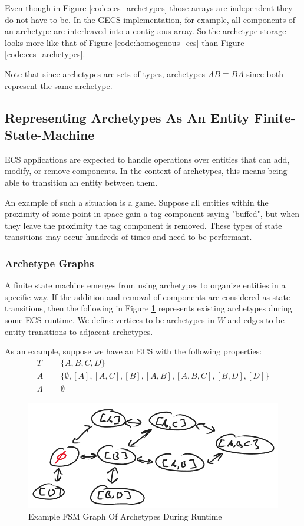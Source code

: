 Even though in Figure \ref{code:ecs_archetypes} those arrays are independent they do not have to be. In the GECS implementation, for example, all components of an archetype are interleaved into a contiguous array. So the archetype storage looks more like that of Figure \ref{code:homogenous_ecs} than Figure \ref{code:ecs_archetypes}.

Note that since archetypes are sets of types, archetypes $AB \equiv BA$ since both represent the same archetype.

\subsection{Representing Archetypes As An Entity Finite-State-Machine}
\label{sec:fsm_arc}
ECS applications are expected to handle operations over entities that can add, modify, or remove components. In the context of archetypes, this means being able to transition an entity between them. 

An example of such a situation is a game. Suppose all entities within the proximity of some point in space gain a tag component saying "buffed", but when they leave the proximity the tag component is removed. These types of state transitions may occur hundreds of times and need to be performant. 

\subsubsection{Archetype Graphs}

A finite state machine emerges from using archetypes to organize entities in a specific way. If the addition and removal of components are considered as state transitions, then the following in Figure \ref{fig:graph1} represents existing archetypes during some ECS runtime. We define vertices to be archetypes in $W$ and edges to be entity transitions to adjacent archetypes.

As an example, suppose we have an ECS with the following properties:
\begin{align}
    T &= \{A,B,C,D\} \\
    A &= \{ \emptyset, [A] , [A,C] ,[B], [A,B], [A,B,C], [B,D], [D]\} \\
    \Lambda &= \emptyset
\end{align}

\begin{figure}[htbp]
    \centering
    \includegraphics[width=0.5\linewidth]{resources/graph1.png}
    \caption{Example FSM Graph Of Archetypes During Runtime}
    \label{fig:graph1}
\end{figure}

